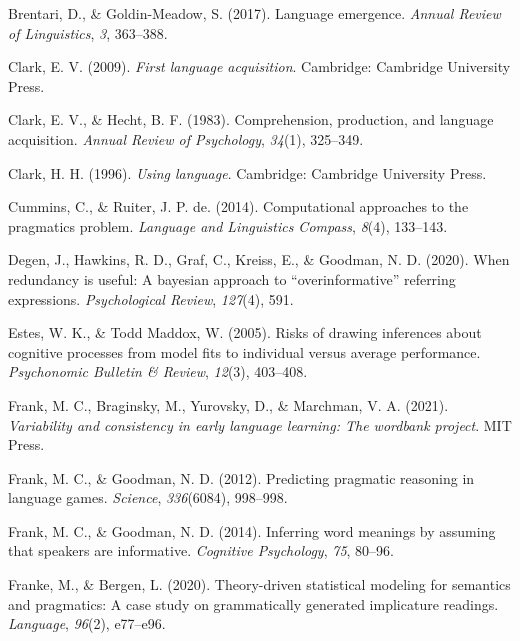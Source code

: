 \documentclass[
  man,mask,floatsintext]{apa6}
\newlength{\cslhangindent}
\newlength{\cslentryspacingunit} %
\newenvironment{CSLReferences}[2] %
 {%
  \setlength{\parindent}{0pt}
  \ifodd #1
  \let\oldpar\par
  \def\par{\hangindent=\cslhangindent\oldpar}
  \fi
  \setlength{\parskip}{#2\cslentryspacingunit}
 }%
 {}
\begin{document}
\begin{CSLReferences}{1}{0}
\leavevmode{}%
Brentari, D., \& Goldin-Meadow, S. (2017). Language emergence. \emph{Annual Review of Linguistics}, \emph{3}, 363--388.

\leavevmode{}%
Clark, E. V. (2009). \emph{First language acquisition}. Cambridge: Cambridge University Press.

\leavevmode{}%
Clark, E. V., \& Hecht, B. F. (1983). Comprehension, production, and language acquisition. \emph{Annual Review of Psychology}, \emph{34}(1), 325--349.

\leavevmode{}%
Clark, H. H. (1996). \emph{Using language}. Cambridge: Cambridge University Press.

\leavevmode{}%
Cummins, C., \& Ruiter, J. P. de. (2014). Computational approaches to the pragmatics problem. \emph{Language and Linguistics Compass}, \emph{8}(4), 133--143.

\leavevmode{}%
Degen, J., Hawkins, R. D., Graf, C., Kreiss, E., \& Goodman, N. D. (2020). When redundancy is useful: A bayesian approach to {``overinformative''} referring expressions. \emph{Psychological Review}, \emph{127}(4), 591.

\leavevmode{}%
Estes, W. K., \& Todd Maddox, W. (2005). Risks of drawing inferences about cognitive processes from model fits to individual versus average performance. \emph{Psychonomic Bulletin \& Review}, \emph{12}(3), 403--408.

\leavevmode{}%
Frank, M. C., Braginsky, M., Yurovsky, D., \& Marchman, V. A. (2021). \emph{Variability and consistency in early language learning: The wordbank project}. MIT Press.

\leavevmode{}%
Frank, M. C., \& Goodman, N. D. (2012). Predicting pragmatic reasoning in language games. \emph{Science}, \emph{336}(6084), 998--998.

\leavevmode{}%
Frank, M. C., \& Goodman, N. D. (2014). Inferring word meanings by assuming that speakers are informative. \emph{Cognitive Psychology}, \emph{75}, 80--96.

\leavevmode{}%
Franke, M., \& Bergen, L. (2020). Theory-driven statistical modeling for semantics and pragmatics: A case study on grammatically generated implicature readings. \emph{Language}, \emph{96}(2), e77--e96.


\end{CSLReferences}
\end{document}
